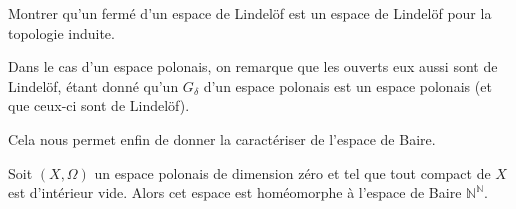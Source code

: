 \begin{exercise}
  Montrer qu'un fermé d'un espace de Lindelöf est un espace de Lindelöf pour la
  topologie induite.
\end{exercise}

\begin{remark}
  Dans le cas d'un espace polonais, on remarque que les ouverts eux aussi sont
  de Lindelöf, étant donné qu'un $G_\delta$ d'un espace polonais est un
  espace polonais (et que ceux-ci sont de Lindelöf).
\end{remark}

Cela nous permet enfin de donner la caractériser de l'espace de Baire.

\begin{theorem}
  Soit $(X,\Omega)$ un espace polonais de dimension zéro et tel que tout compact
  de $X$ est d'intérieur vide. Alors cet espace est homéomorphe à l'espace de
  Baire $\mathbb N^\mathbb N$.
\end{theorem}

